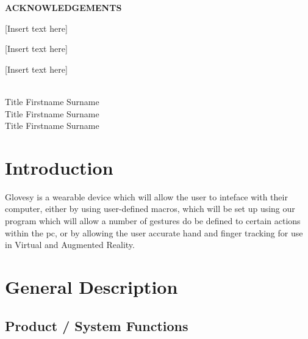 \documentclass[12pt,a4paper,oneside]{book}
\theoremstyle{plain}
\numberwithin{equation}{chapter}
\renewcommand{\contentsname}{\hfill\bfseries\Large TABLE OF CONTENTS \hfill}
\begin{document}
\newpage
\begin{center}
	\large{\textbf{ACKNOWLEDGEMENTS}} \\
\end{center}

[Insert text here]

[Insert text here]

[Insert text here]\\\\

\begin{flushright}
    Title Firstname Surname\\
    Title Firstname Surname\\
    Title Firstname Surname\\
\end{flushright}


\newpage

\tableofcontents
%


\newpage
{}
\listoffigures

\newpage
{}
\listoftables


\newpage
{}
\chapter*{Introduction}

\noindent Glovesy is a wearable device which will allow the user to inteface with their computer, either by using user-defined macros, which will be set up using our program which will allow a number of gestures do be defined to certain actions within the pc, or by allowing the user accurate hand and finger tracking for use in Virtual and Augmented Reality.

\vspace{2cm}

\chapter*{General Description}

\section{Product / System Functions}
\end{document}
